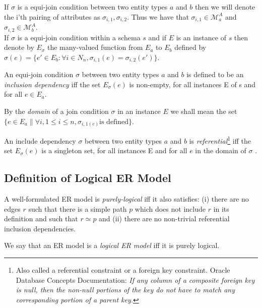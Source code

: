 \documentclass[10pt,a4paper]{article}
\newcommand{\term}[1]{\textit{{#1}}}
\newcommand{\genericmodel}{\mathcal{M}}
\newcommand{\allAttrs}{\genericmodel^A}
\newcommand{\attrs}[1]{\allAttrs_{#1}}
\begin{document}
\noindent If $\sigma$ is a equi-join condition between two entity types $a$ and $b$ then we will denote the i'th pairing of attributes as $\sigma_{i,1},\sigma_{i,2}$. 
Thus we have that  $\sigma_{i,1} \in \attrs{a}$ and $\sigma_{i,2} \in \attrs{b}$. \\

\noindent If $\sigma$ is a equi-join condition within a schema $s$ and if $E$ is an instance of $s$ then denote by $E_\sigma$
the many-valued function from $E_a$ to $E_b$
defined by $\sigma(e) = \{ e' \in E_b : \forall i \in N_n, \sigma_{i,1}(e)=\sigma_{i,2}(e') \}$. \\

\begin{definition}
An equi-join condition  $\sigma$ between two entity types $a$ and $b$ is defined to be an 
\term{inclusion dependency}
iff the set $E_\sigma(e)$ is non-empty, for all instances E of s and for all $e \in E_a$. \\
\end{definition}

\noindent
By the \term{domain} of a join condition $\sigma$ in an instance $E$ we shall mean the  set $\{ e \in E_a \| \forall i, 1 \leq i \leq n, \sigma_{i,1(e)} \mbox{is defined} \}$. \\


\begin{definition}
An include dependency $\sigma$ between two entity types $a$ and $b$ is 
\term{referential}\footnote{Also called a referential constraint or a foreign key constraint. Oracle Database Concepts Documentation: \textit{If any column of a composite foreign key is null, then the non-null portions of the key do not have to match any corresponding portion of a parent key.}  } 
iff the set $E_\sigma(e)$ is a singleton set, for all instances E and for all $e$ in the domain of  $\sigma$ . 
\end{definition}
	
\subsection{Definition of Logical ER Model}

\begin{definition}
A well-formulated ER model is \term{purely-logical}  iff it 
also satisfies:
(i) there are no edges $r$ such that there is 
a simple path $p$ which does not include $r$ in its definition and such that $r \simeq p$  
and (ii) there are no non-trivial referential inclusion dependencies. \\
\end{definition}
\noindent
We say that an ER model is a \term{logical ER model} iff it is purely logical.
\end{document}

